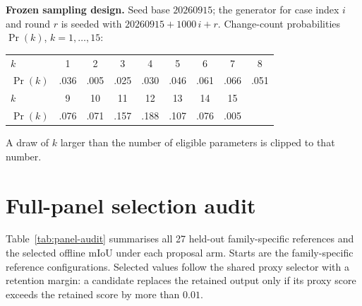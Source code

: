 \documentclass[a4paper,fleqn]{cas-dc}
\begin{document}
{\begin{hlbox}
\noindent\textbf{Frozen sampling design.} Seed base $20260915$; the generator for case index $i$ and round $r$ is seeded with $20260915+1000\,i+r$. Change-count probabilities $\Pr(k)$, $k=1,\ldots,15$:
\begin{center}
\small
\setlength{\tabcolsep}{3.5pt}
\begin{tabular}{@{}l cccccccc@{}}
\toprule
$k$ & 1 & 2 & 3 & 4 & 5 & 6 & 7 & 8 \\
$\Pr(k)$ & .036 & .005 & .025 & .030 & .046 & .061 & .066 & .051 \\
\midrule
$k$ & 9 & 10 & 11 & 12 & 13 & 14 & 15 & \\
$\Pr(k)$ & .076 & .071 & .157 & .188 & .107 & .076 & .005 & \\
\bottomrule
\end{tabular}
\end{center}
A draw of $k$ larger than the number of eligible parameters is clipped to that number.
\end{hlbox}

\section{Full-panel selection audit}\label{app:poc-selection}

Table~\ref{tab:panel-audit} summarises all 27 held-out family-specific references and the selected offline mIoU under each proposal arm. Starts are the family-specific reference configurations. Selected values follow the shared proxy selector with a retention margin: a candidate replaces the retained output only if its proxy score exceeds the retained score by more than $0.01$.

}
\end{document}
